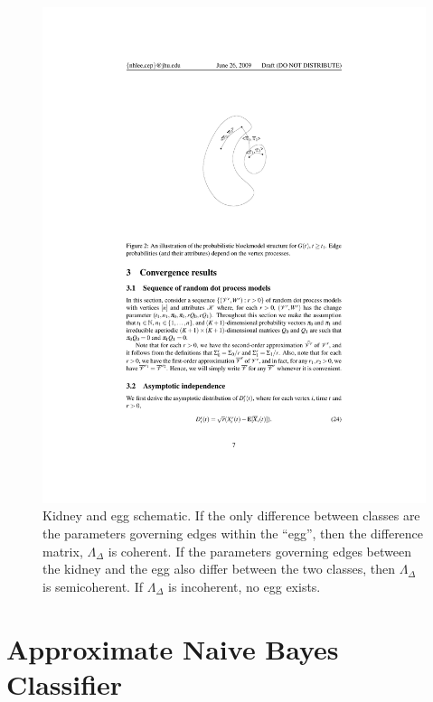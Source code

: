 \documentclass{article}
\newcommand{\Lam}{\Lambda}
\begin{document}
\begin{figure}[h!]
\centering \includegraphics[height=.5\linewidth]{KE}
\caption{Kidney and egg schematic.  If the only difference between classes are the parameters governing edges within the ``egg'', then the difference matrix, $\Lam_{\Delta}$ is coherent. If the parameters governing edges between the kidney and the egg also differ between the two classes, then $\Lam_{\Delta}$ is semicoherent.  If $\Lam_{\Delta}$ is incoherent, no egg exists.
}
\label{fig:KE}
\end{figure}



\section{Approximate Naive Bayes Classifier} %
\label{sec:approximate_naive_bayes_classifier}

\end{document}
